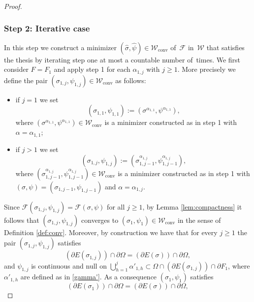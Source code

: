 \documentclass[JEP,XML,SOM,Unicode, NoFloatCountersInSection,published]{cedram}
\let\Om\Omega
\newcommand\admclassconv{{\mathcal W_\mathrm{conv}}}
\theoremstyle{definition}
\begin{document}
\begin{proof}
\subsubsection*{Step 2: Iterative case} In this step we construct a minimizer $(\widehat\sigma,\widehat\psi)\in\admclassconv$ of~$\mathcal F$ in~$\mathcal W$ that satisfies the thesis by iterating step one at most a countable number of~times.
We first consider $F=F_1$ and apply step 1 for each $\alpha_{1,j}$ with $j\ge1$.
More precisely we define the pair $(\sigma_{1,j},\psi_{1,j})\in\admclassconv$ as follows:
\begin{itemize}
\item if $j=1$ we set\vspace*{-3pt}
\begin{equation*}
(\sigma_{1,1},\psi_{1,1}):=(\sigma^{\alpha_{1,1}},\psi^{\alpha_{1,1}} ),
\end{equation*}
where $(\sigma^{\alpha_{1,1}},\psi^{\alpha_{1,1}} )\in\admclassconv$ is a minimizer constructed as in step 1 with $\alpha=\alpha_{1,1}$;
\item if $j>1$ we set\vspace*{-3pt}
\begin{equation*}
(\sigma_{1,j},\psi_{1,j}):= (\sigma_{1,j-1}^{\alpha_{1,j}},\psi_{1,j-1}^{{\alpha}_{1,j}}),
\end{equation*}
where $(\sigma_{1,j-1}^{\alpha_{1,j}},\psi_{1,j-1}^{{\alpha}_{1,j}})\in\admclassconv$ is a minimizer constructed as in step 1 with $(\sigma,\psi)=(\sigma_{1,j-1},\psi_{1,j-1})$ and $\alpha=\alpha_{1,j}$.
\end{itemize}
Since
$
\mathcal{F}(\sigma_{1,j},\psi_{1,j})=\mathcal F(\sigma,\psi)
$
for all $j\ge1$, by Lemma \ref{lem:compactness} it follows that $(\sigma_{1,j},\psi_{1,j})$ converges to $(\sigma_1,\psi_1)\in\admclassconv$ in the sense of Definition \ref{def:conv}. Moreover, by construction we have that for every $j\ge1$ the pair $(\sigma_{1,j},\psi_{1,j})$ satisfies
\begin{equation*}
(\partial E(\sigma_{1,j}))\cap\partial\Om= (\partial E(\sigma))\cap\partial\Om,
\end{equation*}
and $\psi_{1,j}$ is continuous and null on $\bigcup_{h=1}^j\alpha'_{1,h}\subset \Om\cap(\partial E(\sigma_{1,j}))\cap\partial F_1$,
where $\alpha'_{1,h}$ are defined as in \eqref{gamma'}. As a consequence $(\sigma_1,\psi_1)$ satisfies
\begin{equation*}
(\partial E(\sigma_{1}))\cap\partial\Om= (\partial E(\sigma))\cap\partial\Om,
\end{equation*}

\end{proof}
\end{document}
